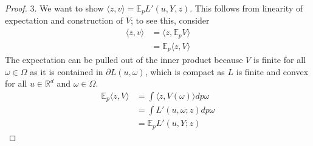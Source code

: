 \documentclass{article}
\newcommand{\reals}{\mathbb{R}}
\newcommand{\E}{\mathbb{E}}
\newcommand{\inprod}[2]{\langle #1, #2 \rangle}%
\begin{document}
\begin{proof}
\bigskip

3.
We want to show $\inprod{z}{v} = \E_p L'(u,Y,z)$.
This follows from linearity of expectation and construction of $V$; to see this, consider
\begin{align*}
\inprod{z}{v} &= \inprod{z}{\E_p V} \\
 &= \E_p \inprod{z}{V}
 \end{align*}
 The expectation can be pulled out of the inner product because $V$ is finite for all $\omega \in \Omega$ as it is contained in $\partial L(u,\omega)$, which is compact as $L$ is finite and convex for all $u \in \reals^d$ and $\omega \in \Omega$.
 \begin{align*}
 \E_p \inprod{z}{V} &= \int \inprod{z}{V(\omega)} dp\omega \\
 &= \int L'(u,\omega; z) dp\omega \\
 &= \E_p L'(u,Y;z)
\end{align*}



\iffalse
	Suppose we are given $z\in \reals^d$.
	We have $\E_p \partial L(u,Y)$ compact (by convexity of $L$).
	Additionally, we know for all $\omega \in \Omega$, $\sup_{x \in \partial L'(u,\omega,z)} \inprod{x}{z} := \delta_{\partial L(u,\omega)}(z)$ is attained, and for any $v \in \delta_{\partial L(u,\omega)}(z)$, we particularly have $v \in \partial L'(u,\omega, z)$.
	
	
	
	\begin{itemize}
		\item $v \in \E_p \partial L(u,Y)$
		\item $\inprod{z}{v'} = \E_p L'(u,Y,z)$.
	\end{itemize}
\fi	
	 
\end{proof}



\end{document}
